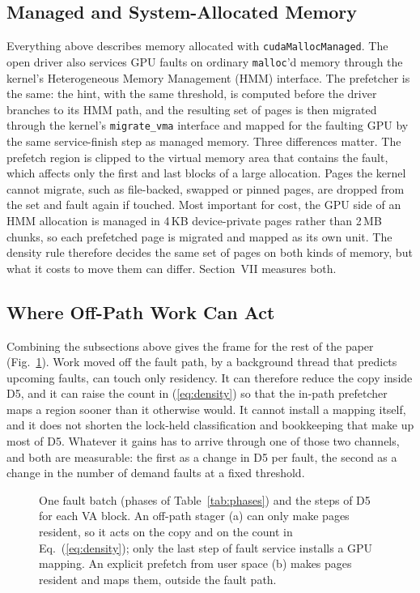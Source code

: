 \subsection{Managed and System-Allocated Memory}
\label{sec:bg-hmm}

Everything above describes memory allocated with \texttt{cudaMallocManaged}.
The open driver also services GPU faults on ordinary \texttt{malloc}'d memory
through the kernel's Heterogeneous Memory Management (HMM) interface. The
prefetcher is the same: the hint, with the same threshold, is computed before
the driver branches to its HMM path, and the resulting set of pages is then
migrated through the kernel's \texttt{migrate\_vma} interface and mapped for
the faulting GPU by the same service-finish step as managed memory. Three
differences matter. The prefetch region is clipped to the virtual memory area
that contains the fault, which affects only the first and last blocks of a
large allocation. Pages the kernel cannot migrate, such as file-backed,
swapped or pinned pages, are dropped from the set and fault again if touched.
Most important for cost, the GPU side of an HMM allocation is managed in
4\,KB device-private pages rather than 2\,MB chunks, so each prefetched page
is migrated and mapped as its own unit. The density rule therefore decides the
same set of pages on both kinds of memory, but what it costs to move them can
differ. Section~VII measures both.

\subsection{Where Off-Path Work Can Act}
\label{sec:bg-where}

Combining the subsections above gives the frame for the rest of the paper
(Fig.~\ref{fig:faultpath}).
Work moved off the fault path, by a background thread that predicts upcoming
faults, can touch only residency. It can therefore reduce the copy inside D5,
and it can raise the count in (\ref{eq:density}) so that the in-path
prefetcher maps a region sooner than it otherwise would. It cannot install a
mapping itself, and it does not shorten the lock-held classification and
bookkeeping that make up most of D5. Whatever it gains has to arrive through
one of those two channels, and both are measurable: the first as a change in
D5 per fault, the second as a change in the number of demand faults at a
fixed threshold.

\begin{figure}[t]
\centering

\caption{One fault batch (phases of Table~\ref{tab:phases}) and the steps of
D5 for each VA block. An off-path stager (a) can only make pages resident, so it
acts on the copy and on the count in Eq.~(\ref{eq:density}); only the last step
of fault service installs a GPU mapping. An explicit prefetch from user space
(b) makes pages resident and maps them, outside the fault path.}
\label{fig:faultpath}
\end{figure}
